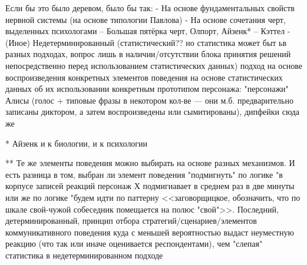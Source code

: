 Если бы это было деревом, было бы так:
- На основе фундаментальных свойств нервной системы (на основе типологии Павлова)
- На основе сочетания черт, выделенных психологами
-- Большая пятёрка черт, Олпорт, Айзенк*
-- Кэттел
- (Иное) Недетерминированный (статистический?? но статистика может быт ьв разных подходах, вопрос лишь в наличии/отсутствии блока принятия решений непосредственно перед использованием статистических данных) подход на основе воспроизведения конкретных элементов поведения на основе статистических данных об их использовании конкретным прототипом персонажа: "персонажи" Алисы (голос + типовые фразы в некотором кол-ве --- они м.б. предварительно записаны диктором, а затем воспроизведены или сымитированы), дипфейки сюда же


* Айзенк и к биологии, и к психологии

** Те же элементы поведения можно выбирать на основе разных механизмов. И есть разница в том, выбран ли элемент поведения "подмигнуть" по логике "в корпусе записей реакций персонаж Х подмигиавает в среднем раз в две минуты или же по логике "будем идти по паттерну <<заговорщицкое, обозначить, что по шкале свой-чужой собеседник помещается на полюс "свой">>. Последний, детерминированный, принцип отбора стратегий/сценариев/элементов коммуникативного поведения куда с меньшей вероятностью выдаст неуместную реакцию (что так или иначе оценивается респондентами), чем "слепая" статистика в недетерминированном подходе

